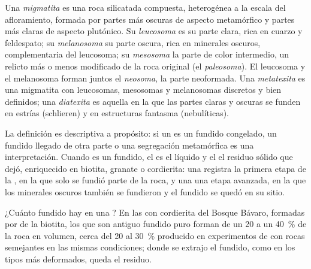 \begin{definition}\label{def:b2:crustal-melting:migmatite}
Una \emph{migmatita} es una roca silicatada compuesta, heterogénea a la escala
del afloramiento, formada por partes más oscuras de aspecto metamórfico y partes más claras
de aspecto plutónico. Su \emph{leucosoma} es su parte clara, rica en cuarzo y
feldespato; su \emph{melanosoma} su parte oscura, rica en minerales
oscuros, complementaria del leucosoma; su \emph{mesosoma} la parte de color
intermedio, un relicto más o menos modificado de la roca original (el \emph{paleosoma}). El
leucosoma y el melanosoma forman juntos el \emph{neosoma}, la parte neoformada. Una
\emph{metatexita} es una migmatita con leucosomas, mesosomas y melanosomas
discretos y bien definidos; una \emph{diatexita} es aquella en la que las partes claras y
oscuras se funden en estrías (schlieren) y en estructuras fantasma (nebulíticas).
\end{definition}

La definición es descriptiva a propósito: si un  es un fundido congelado, un fundido
llegado de otra parte o una segregación metamórfica es una interpretación. Cuando es un
fundido, el  es el líquido y el  el residuo sólido que dejó, enriquecido en
biotita, granate o cordierita: una  registra la primera etapa de la , en la que
solo se fundió parte de la roca, y una  una etapa avanzada, en la que los minerales oscuros
también se fundieron y el fundido se quedó en su sitio.

¿Cuánto fundido hay en una ? En las  con cordierita del Bosque Bávaro,
formadas por  de la biotita, los  que son antiguo fundido puro forman de un 20 a un
\qty{40}{\percent} de la roca en volumen, cerca del 20 al \qty{30}{\percent} producido en
experimentos de  con rocas semejantes en las mismas condiciones; donde se extrajo el
fundido, como en los tipos más deformados, queda el residuo.

